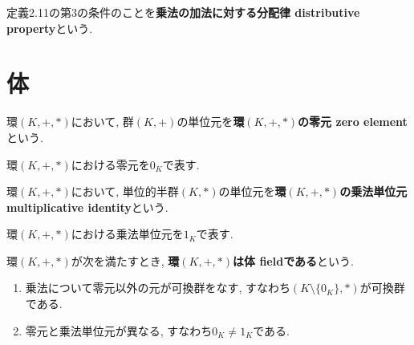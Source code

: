 定義2.11の第3の条件のことを{\bf 乗法の加法に対する分配律 distributive property}という.

\section{体}
\begin{Def}
環$(K,+,*)$において,
群$(K,+)$の単位元を{\bf 環$(K,+,*)$の零元 zero element} という.
\end{Def}
\begin{Notation}
環$(K,+,*)$における零元を$0_K$で表す.
\end{Notation}
\begin{Def}
環$(K,+,*)$において,
単位的半群$(K,*)$の単位元を{\bf 環$(K,+,*)$の乗法単位元 multiplicative identity}という.
\end{Def}
\begin{Notation}
環$(K,+,*)$における乗法単位元を$1_K$で表す.
\end{Notation}

\begin{Def}
環$(K,+,*)$が次を満たすとき, {\bf 環$(K,+,*)$は体 fieldである}という.
\begin{enumerate}
\item 乗法について零元以外の元が可換群をなす, すなわち$(K\setminus\{0_K\},*)$が可換群である.
\item 零元と乗法単位元が異なる, すなわち$0_K\neq 1_K$である.
\end{enumerate}
\end{Def}